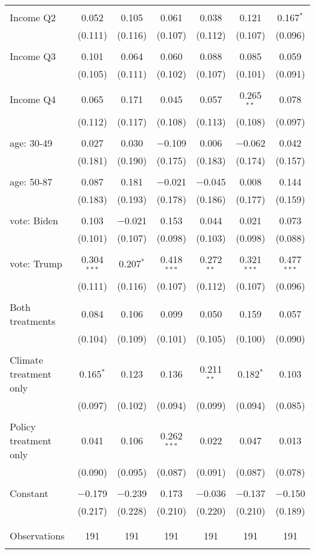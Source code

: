 \begin{tabular}{@{\extracolsep{5pt}}lcccccc}
  & & & & & & \\ 
 Income Q2 & 0.052 & 0.105 & 0.061 & 0.038 & 0.121 & 0.167$^{*}$ \\ 
  & (0.111) & (0.116) & (0.107) & (0.112) & (0.107) & (0.096) \\ 
  & & & & & & \\ 
 Income Q3 & 0.101 & 0.064 & 0.060 & 0.088 & 0.085 & 0.059 \\ 
  & (0.105) & (0.111) & (0.102) & (0.107) & (0.101) & (0.091) \\ 
  & & & & & & \\ 
 Income Q4 & 0.065 & 0.171 & 0.045 & 0.057 & 0.265$^{**}$ & 0.078 \\ 
  & (0.112) & (0.117) & (0.108) & (0.113) & (0.108) & (0.097) \\ 
  & & & & & & \\ 
 age: 30-49 & 0.027 & 0.030 & $-$0.109 & 0.006 & $-$0.062 & 0.042 \\ 
  & (0.181) & (0.190) & (0.175) & (0.183) & (0.174) & (0.157) \\ 
  & & & & & & \\ 
 age: 50-87 & 0.087 & 0.181 & $-$0.021 & $-$0.045 & 0.008 & 0.144 \\ 
  & (0.183) & (0.193) & (0.178) & (0.186) & (0.177) & (0.159) \\ 
  & & & & & & \\ 
 vote: Biden & 0.103 & $-$0.021 & 0.153 & 0.044 & 0.021 & 0.073 \\ 
  & (0.101) & (0.107) & (0.098) & (0.103) & (0.098) & (0.088) \\ 
  & & & & & & \\ 
 vote: Trump & 0.304$^{***}$ & 0.207$^{*}$ & 0.418$^{***}$ & 0.272$^{**}$ & 0.321$^{***}$ & 0.477$^{***}$ \\ 
  & (0.111) & (0.116) & (0.107) & (0.112) & (0.107) & (0.096) \\ 
  & & & & & & \\ 
 Both treatments & 0.084 & 0.106 & 0.099 & 0.050 & 0.159 & 0.057 \\ 
  & (0.104) & (0.109) & (0.101) & (0.105) & (0.100) & (0.090) \\ 
  & & & & & & \\ 
 Climate treatment only & 0.165$^{*}$ & 0.123 & 0.136 & 0.211$^{**}$ & 0.182$^{*}$ & 0.103 \\ 
  & (0.097) & (0.102) & (0.094) & (0.099) & (0.094) & (0.085) \\ 
  & & & & & & \\ 
 Policy treatment only & 0.041 & 0.106 & 0.262$^{***}$ & 0.022 & 0.047 & 0.013 \\ 
  & (0.090) & (0.095) & (0.087) & (0.091) & (0.087) & (0.078) \\ 
  & & & & & & \\ 
 Constant & $-$0.179 & $-$0.239 & 0.173 & $-$0.036 & $-$0.137 & $-$0.150 \\ 
  & (0.217) & (0.228) & (0.210) & (0.220) & (0.210) & (0.189) \\ 
  & & & & & & \\ 
\hline \\[-1.8ex] 

Observations & 191 & 191 & 191 & 191 & 191 & 191 \\ 
\hline 
\hline \\[-1.8ex] 
\end{tabular} 